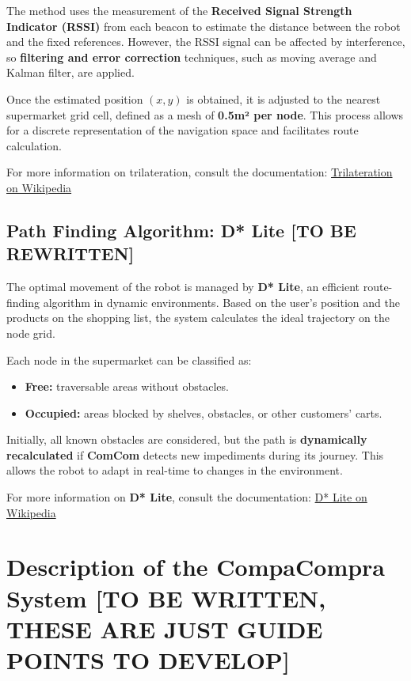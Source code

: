 \documentclass[a4paper,12pt]{article}
\begin{document}
The method uses the measurement of the \textbf{Received Signal Strength Indicator (RSSI)} from each beacon to estimate the distance between the robot and the fixed references. However, the RSSI signal can be affected by interference, so \textbf{filtering and error correction} techniques, such as moving average and Kalman filter, are applied.

Once the estimated position \((x, y)\) is obtained, it is adjusted to the nearest supermarket grid cell, defined as a mesh of \textbf{0.5m² per node}. This process allows for a discrete representation of the navigation space and facilitates route calculation.

For more information on trilateration, consult the documentation:
\href{https://en.wikipedia.org/wiki/Trilateration}{Trilateration on Wikipedia}

\subsection{Path Finding Algorithm: D* Lite [TO BE REWRITTEN]}
The optimal movement of the robot is managed by \textbf{D* Lite}, an efficient route-finding algorithm in dynamic environments. Based on the user's position and the products on the shopping list, the system calculates the ideal trajectory on the node grid.

Each node in the supermarket can be classified as:
\begin{itemize}
\item \textbf{Free:} traversable areas without obstacles.
\item \textbf{Occupied:} areas blocked by shelves, obstacles, or other customers' carts.
\end{itemize}

Initially, all known obstacles are considered, but the path is \textbf{dynamically recalculated} if \textbf{ComCom} detects new impediments during its journey. This allows the robot to adapt in real-time to changes in the environment.

For more information on \textbf{D* Lite}, consult the documentation:
\href{https://en.wikipedia.org/wiki/D*_Lite}{D* Lite on Wikipedia} %

\section{Description of the CompaCompra System [TO BE WRITTEN, THESE ARE JUST GUIDE POINTS TO DEVELOP]}
\end{document}
